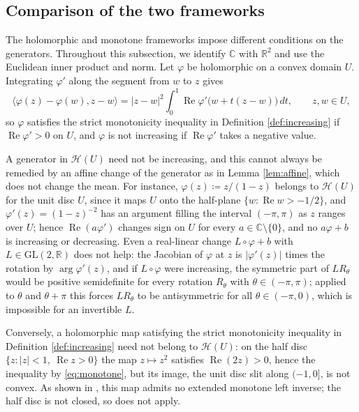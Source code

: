 \documentclass[a4paper, reqno, 11pt]{amsart}
\theoremstyle{definition}
\begin{document}
\subsection{Comparison of the two frameworks}\label{subsec:comparison}

The holomorphic and monotone frameworks impose different conditions on the generators.
Throughout this subsection, we identify $\mathbb{C}$ with $\mathbb{R}^2$ and use the Euclidean inner product and norm.
Let $\varphi$ be holomorphic on a convex domain $U$.
Integrating $\varphi'$ along the segment from $w$ to $z$ gives
\begin{equation}\label{eq:monotone}
\langle \varphi(z) - \varphi(w), z - w \rangle = |z-w|^2 \int_0^1 \operatorname{Re} \varphi'\big( w + t(z-w) \big)\, dt, \qquad z, w \in U ,
\end{equation}
so $\varphi$ satisfies the strict monotonicity inequality in Definition \ref{def:increasing} if $\operatorname{Re} \varphi' > 0$ on $U$, and $\varphi$ is not increasing if $\operatorname{Re} \varphi'$ takes a negative value.

A generator in $\mathcal{H}(U)$ need not be increasing, and this cannot always be remedied by an affine change of the generator as in Lemma \ref{lem:affine}, which does not change the mean.
For instance, $\varphi(z) \coloneqq  z/(1-z)$ belongs to $\mathcal{H}(U)$ for the unit disc $U$, since it maps $U$ onto the half-plane $\{ w : \operatorname{Re} w > -1/2 \}$, and $\varphi'(z) = (1-z)^{-2}$ has an argument filling the interval $(-\pi, \pi)$ as $z$ ranges over $U$; hence $\operatorname{Re}(a \varphi')$ changes sign on $U$ for every $a \in \mathbb{C} \setminus \{0\}$, and no $a\varphi + b$ is increasing or decreasing.
Even a real-linear change $L \circ \varphi + b$ with $L \in \mathrm{GL}(2,\mathbb{R})$ does not help: the Jacobian of $\varphi$ at $z$ is $|\varphi'(z)|$ times the rotation by $\arg \varphi'(z)$, and if $L \circ \varphi$ were increasing, the symmetric part of $L R_{\theta}$ would be positive semidefinite for every rotation $R_{\theta}$ with $\theta \in (-\pi,\pi)$; applied to $\theta$ and $\theta + \pi$ this forces $L R_{\theta}$ to be antisymmetric for all $\theta \in (-\pi, 0)$, which is impossible for an invertible $L$.

Conversely, a holomorphic map satisfying the strict monotonicity inequality in Definition \ref{def:increasing} need not belong to $\mathcal{H}(U)$: on the half disc $\{ z : |z| < 1, \ \operatorname{Re} z > 0 \}$ the map $z \mapsto z^2$ satisfies $\operatorname{Re}(2z) > 0$, hence the inequality by \eqref{eq:monotone}, but its image, the unit disc slit along $(-1,0]$, is not convex. 
As shown in \cite[Example 1]{Toth}, this map admits no extended monotone left inverse; the half disc is not closed, so \cite[Theorem 2]{Toth} does not apply.
\end{document}
